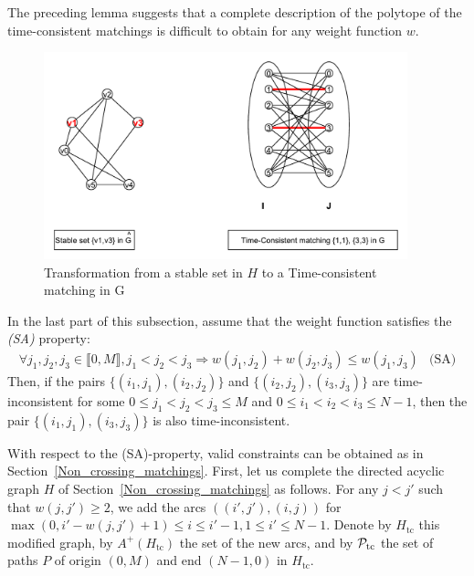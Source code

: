 \documentclass[11pt]{article}
\theoremstyle{plain}%
\theoremstyle{definition} \newtheorem{lem}{Lemma}[section]
\theoremstyle{definition} \newtheorem{claim}{Claim}[lem]
\theoremstyle{definition} \newtheorem{theorem}{Theorem}[section]
\theoremstyle{definition} \newtheorem{exo}{Exercice n$^\circ$}
\theoremstyle{definition} \newtheorem{quest}{}[exo]
\theoremstyle{definition} \newtheorem{sousquest}{}[quest]
\theoremstyle{remark}
\theoremstyle{definition}
\begin{document}
The preceding lemma suggests that a complete description of the polytope of the
time-consistent matchings is difficult to obtain for any weight function $w$. 
\begin{figure}[!ht]
	\centerline{
		\includegraphics[height=60mm]{ConsistCompl.pdf}}
	\caption[]{Transformation from a stable set in $H$ to a Time-consistent matching in G}
	\label{TIM}
\end{figure}
%

In the last part of this subsection, assume that the weight function satisfies the \emph{(SA)} property:
$$ \begin{array}{lr}
\forall j_1, j_2, j_3 \in \llbracket 0, M \rrbracket, j_1 < j_2 < j_3 \Rightarrow w(j_1, j_2) + w(j_2, j_3) \leq w(j_1, j_3) & \textrm{(SA)}
\end{array} $$ 
%
Then, if the pairs $\{(i_1, j_1), (i_2, j_2) \}$ and  $\{(i_2, j_2), (i_3, j_3) \}$ are time-inconsistent
for some $ 0\leq j_1 < j_2< j_3 \leq M$ and $ 0\leq i_1 < i_2 < i_3 \leq N-1$, then 
the pair $\{(i_1, j_1), (i_3, j_3) \}$ is also time-inconsistent.

With respect to the (SA)-property, valid constraints can be obtained as in Section~\ref{Non_crossing_matchings}.
First, let us complete the directed acyclic graph $H$ of Section~\ref{Non_crossing_matchings}  as follows.
For any $j < j'$ such that $w(j, j') \geq 2$, we add
 the arcs $((i' ,j'), (i,j))$ for $ \max(0, i' - w(j, j') +1) \leq i \leq i'-1, 1 \leq i' \leq N-1$.
 Denote by $H_\textrm{tc}$ this modified graph, by $A^+(H_\textrm{tc})$ the set of the new arcs, and
 by ${\cal P}_\textrm{tc}$ the set of  paths $P$ of origin $(0, M)$ and end $(N-1, 0)$ in $H_\textrm{tc}$.
\end{document}

